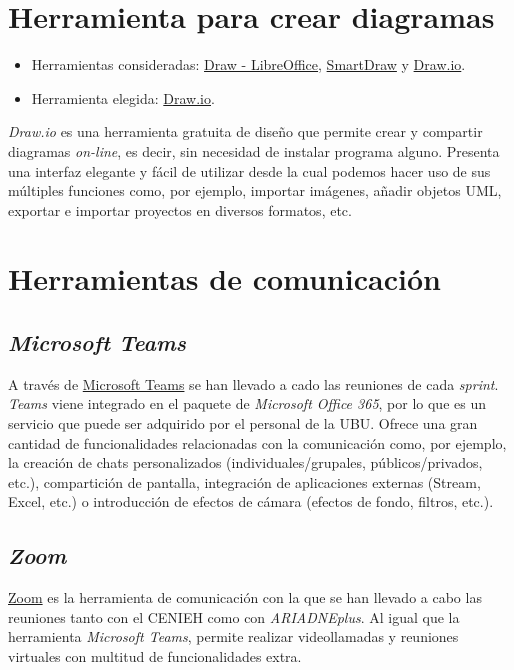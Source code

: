 \section{Herramienta para crear diagramas}

\begin{itemize}
\tightlist
\item
  Herramientas consideradas:
  \href{https://es.libreoffice.org/descubre/draw/}{Draw - LibreOffice},
  \href{https://www.smartdraw.com/}{SmartDraw} y
  \href{https://app.diagrams.net/}{Draw.io}.
\item
  Herramienta elegida: \href{https://app.diagrams.net/}{Draw.io}.
\end{itemize}

\emph{Draw.io} es una herramienta gratuita de diseño que permite crear y
compartir diagramas \emph{on-line}, es decir, sin necesidad de instalar
programa alguno. Presenta una interfaz elegante y fácil de utilizar
desde la cual podemos hacer uso de sus múltiples funciones como, por
ejemplo, importar imágenes, añadir objetos UML, exportar e importar
proyectos en diversos formatos, etc.

\section{Herramientas de comunicación}

\subsection{\emph{Microsoft Teams}}

A través de
\href{https://www.microsoft.com/es-es/education/products/teams}{Microsoft
Teams} se han llevado a cado las reuniones de cada \emph{sprint}.
\emph{Teams} viene integrado en el paquete de \emph{Microsoft Office
365}, por lo que es un servicio que puede ser adquirido por el personal
de la UBU. Ofrece una gran cantidad de funcionalidades relacionadas con
la comunicación como, por ejemplo, la creación de chats personalizados
(individuales/grupales, públicos/privados, etc.), compartición de
pantalla, integración de aplicaciones externas (Stream, Excel, etc.) o
introducción de efectos de cámara (efectos de fondo, filtros, etc.).

\subsection{\emph{Zoom}}

\href{https://www.microsoft.com/es-es/education/products/teams}{Zoom}
es la herramienta de comunicación con la que se han llevado a cabo las reuniones tanto con el
CENIEH como con \emph{ARIADNEplus}. Al igual que la herramienta \emph{Microsoft
Teams}, permite realizar videollamadas y reuniones virtuales con
multitud de funcionalidades extra.

